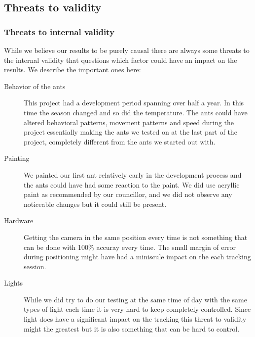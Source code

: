 
\subsection{Threats to validity}


\subsubsection{Threats to internal validity}

While we believe our results to be purely causal there are always some threats to the internal validity that questions which factor could have an impact on the results. We describe the important ones here:

\begin{description}
\item[Behavior of the ants] This project had a development period spanning over half a year. In this time the season changed and so did the temperature. The ants could have altered behavioral patterns, movement patterns and speed during the project essentially making the ants we tested on at the last part of the project, completely different from the ants we started out with. \\

\item[Painting] We painted our first ant relatively early in the development process and the ants could have had some reaction to the paint. We did use acryllic paint as recommended by our councillor, and we did not observe any noticeable changes but it could still be present. \\

\item[Hardware] Getting the camera in the same position every time is not something that can be done with 100\% accuray every time. The small margin of error during positioning might have had a miniscule impact on the each tracking session. \\

\item[Lights] While we did try to do our testing at the same time of day with the same types of light each time it is very hard to keep completely controlled. Since light does have a significant impact on the tracking this threat to validity might the greatest but it is also something that can be hard to control. \\    
\end{description}

